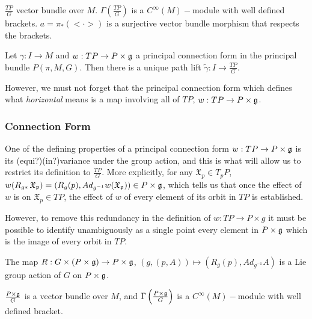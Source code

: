 \begin{definition}
$\frac{TP}{G}$ vector bundle over $M$. $\Gamma(\frac{TP}{G})$ is a $C^\infty(M)-$module with well defined brackets. $a = \pi_{*}(<\cdot>)$ is a surjective vector bundle morphism that respects the brackets.  
\end{definition}

\begin{theorem}
Let $\gamma:I \to M$ and $w:TP \to P \times \mathfrak{g}$ a principal connection form in the principal bundle $P(\pi, M, G)$. Then there is a unique path lift $\tilde{\gamma}:I \to \frac{TP}{G}$.
\end{theorem}

However, we must not forget that the principal connection form which defines what \emph{horizontal} means is  a map involving all of $TP$, $w:TP \to P\times \mathfrak{g}$. 

\subsubsection{Connection Form}

One of the defining properties of a principal connection form $w:TP \to P \times \mathfrak{g}$ is its (equi?)(in?)variance under the group action, and this is what will allow us to restrict its definition to $\frac{TP}{G}$. More explicitly, for any $\mathfrak X_p \in T_p P$, $w(R_{g*}\,\mathfrak{X_p}) = (R_g(p), Ad_{g^{-1}} w(\mathfrak{X_p})) \in P \times \mathfrak{g}$, which tells us that once the effect of $w$ is on $\mathfrak{X}_p \in TP$, the effect of $w$ of every element of its orbit in $TP$ is established.

However, to remove this redundancy in the definition of $w:TP \to P \times g$ it must be possible to identify unambiguously as a single point every element in $P \times \mathfrak{g}$ which is the image of every orbit in $TP$.

\begin{proposition}
The map $R:G \times (P \times \mathfrak{g}) \to P \times \mathfrak{g}$, $(g, (p, A)) \mapsto (R_g(p), Ad_{g^{-1}} A)$ is a Lie group action of $G$ on $P \times \mathfrak{g}$.
\end{proposition}

\begin{definition}
$\frac{P \times \mathfrak{g}}{G}$ is a vector bundle over $M$, and $\Gamma \left(\frac{P \times \mathfrak{g}}{G} \right)$ is a $C^\infty(M)-$module with well defined bracket.
\end{definition}

